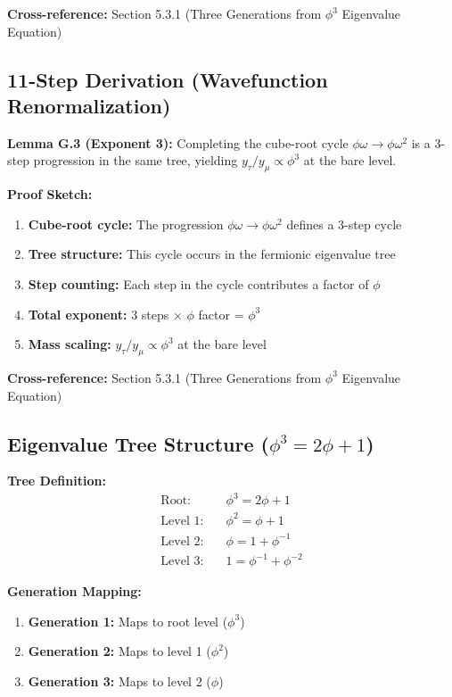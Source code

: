 \documentclass[11pt]{article}
\theoremstyle{definition}
\newcommand{\goldenratio}{\phi}
\begin{document}
\textbf{Cross-reference:} Section 5.3.1 (Three Generations from $\goldenratio^3$ Eigenvalue Equation)

\subsection{11-Step Derivation (Wavefunction Renormalization)}

\textbf{Lemma G.3 (Exponent 3):} Completing the cube-root cycle $\goldenratio\omega \to \goldenratio\omega^2$ is a 3-step progression in the same tree, yielding $y_\tau/y_\mu \propto \goldenratio^3$ at the bare level.

\textbf{Proof Sketch:}
\begin{enumerate}
\item \textbf{Cube-root cycle:} The progression $\goldenratio\omega \to \goldenratio\omega^2$ defines a 3-step cycle
\item \textbf{Tree structure:} This cycle occurs in the fermionic eigenvalue tree
\item \textbf{Step counting:} Each step in the cycle contributes a factor of $\goldenratio$
\item \textbf{Total exponent:} 3 steps × $\goldenratio$ factor = $\goldenratio^3$
\item \textbf{Mass scaling:} $y_\tau/y_\mu \propto \goldenratio^3$ at the bare level
\end{enumerate}

\textbf{Cross-reference:} Section 5.3.1 (Three Generations from $\goldenratio^3$ Eigenvalue Equation)

\subsection{Eigenvalue Tree Structure ($\goldenratio^3 = 2\goldenratio + 1$)}

\textbf{Tree Definition:}
\begin{align}
\text{Root:} \quad &\goldenratio^3 = 2\goldenratio + 1 \\
\text{Level 1:} \quad &\goldenratio^2 = \goldenratio + 1 \\
\text{Level 2:} \quad &\goldenratio = 1 + \goldenratio^{-1} \\
\text{Level 3:} \quad &1 = \goldenratio^{-1} + \goldenratio^{-2}
\end{align}

\textbf{Generation Mapping:}
\begin{enumerate}
\item \textbf{Generation 1:} Maps to root level ($\goldenratio^3$)
\item \textbf{Generation 2:} Maps to level 1 ($\goldenratio^2$)
\item \textbf{Generation 3:} Maps to level 2 ($\goldenratio$)
\end{enumerate}
\end{document}
